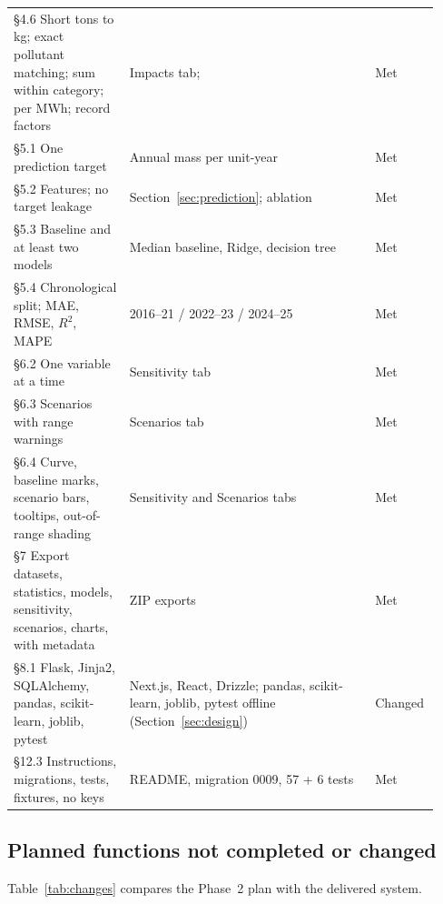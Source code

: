 \documentclass[11pt,a4paper]{article}
\begin{document}
{\begin{longtable}{@{}R{0.26\linewidth}R{0.55\linewidth}R{0.12\linewidth}@{}}
\S4.6 Short tons to kg; exact pollutant matching; sum within category; per MWh; record factors & Impacts tab;  & Met\\
\S5.1 One prediction target & Annual \NOx{} mass per unit-year & Met\\
\S5.2 Features; no target leakage & Section~\ref{sec:prediction}; ablation & Met\\
\S5.3 Baseline and at least two models & Median baseline, Ridge, decision tree & Met\\
\S5.4 Chronological split; MAE, RMSE, $R^2$, MAPE & 2016--21 / 2022--23 / 2024--25 & Met\\
\S6.2 One variable at a time & Sensitivity tab & Met\\
\S6.3 Scenarios with range warnings & Scenarios tab & Met\\
\S6.4 Curve, baseline marks, scenario bars, tooltips, out-of-range shading & Sensitivity and Scenarios tabs & Met\\
\S7 Export datasets, statistics, models, sensitivity, scenarios, charts, with metadata & ZIP exports & Met\\
\S8.1 Flask, Jinja2, SQLAlchemy, pandas, scikit-learn, joblib, pytest & Next.js, React, Drizzle; pandas, scikit-learn, joblib, pytest offline (Section~\ref{sec:design}) & Changed\\
\S12.3 Instructions, migrations, tests, fixtures, no keys & README, migration 0009, 57 + 6 tests & Met\\
\bottomrule
\end{longtable}}

\subsection{Planned functions not completed or changed}

Table~\ref{tab:changes} compares the Phase~2 plan with the delivered system.
\end{document}
